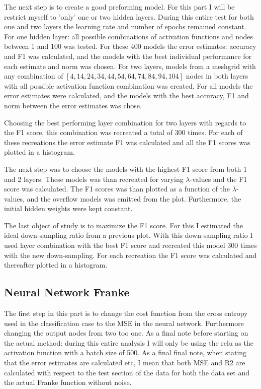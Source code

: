 \documentclass[uio,jmp,amsmath,amssymb,reprint,nofootinbib]{revtex4-1}
\numberwithin{equation}{section}
\begin{document}
The next step is to create a good preforming model. For this part I will be restrict myself to 'only' one or two hidden layers. During this entire test for both one and two layers the learning rate and number of epochs remained constant. For one hidden layer: all possible combinations of activation functions and nodes between 1 and 100 was tested. For these 400 models the error estimates: accuracy and F1 was calculated, and the models with the best individual performance for each estimate and norm was chosen. For two layers, models from a meshgrid with any combination of \([4, 14, 24, 34, 44, 54, 64, 74, 84, 94, 104]\) nodes in both layers with all possible activation function combination was created. For all models the error estimates were calculated, and the models with the best accuracy, F1 and norm between the error estimates was chose.

Choosing the best performing layer combination for two layers with regards to the F1 score, this combination was recreated a total of 300 times. For each of these recreations the error estimate F1 was calculated and all the F1 scores was plotted in a histogram.

The next step was to choose the models with the highest F1 score from both 1 and 2 layers. These models was than recreated for varying \(\lambda\)-values and the F1 score was calculated. The F1 scores was than plotted as a function of the \(\lambda\)-values, and the overflow models was emitted from the plot. Furthermore, the initial hidden weights were kept constant.

The last object of study is to maximize the F1 score. For this I estimated the ideal down-sampling ratio from a previous plot. With this down-sampling ratio I used layer combination with the best F1 score and recreated this model 300 times with the new down-sampling. For each recreation the F1 score was calculated and thereafter plotted in a histogram.

\subsection{Neural Network Franke}

The first step in this part is to change the cost function from the cross entropy used in the classification case to the MSE in the neural network. Furthermore changing the output nodes from two too one. As a final note before starting on the actual method: during this entire analysis I will only be using the relu as the activation function with a batch size of 500. As a final final note, when stating that the error estimates are calculated etc, I mean that both MSE and R2 are calculated with respect to the test section of the data for both the data set and the actual Franke function without noise.
\end{document}
